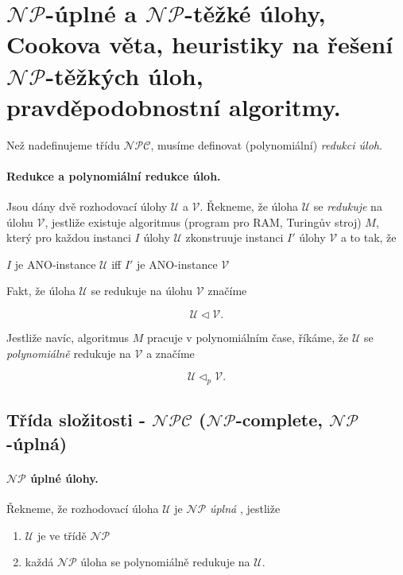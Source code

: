 \section[TAL - $\mathcal{NP}$ (complete, hard), Cookova věta, ..]{$\mathcal{NP}$-úplné a $\mathcal{NP}$-těžké úlohy, Cookova věta, heuristiky na řešení $\mathcal{NP}$-těžkých úloh, pravděpodobnostní algoritmy.}

Než nadefinujeme třídu $\mathcal{NPC}$, musíme definovat (polynomiální) \textit{redukci úloh}.

\paragraph{Redukce a polynomiální redukce úloh.} Jsou dány dvě rozhodovací úlohy $\mathcal{U}$ a $\mathcal{V}$. Řekneme, že úloha $\mathcal{U}$ se \textit{redukuje} na úlohu $\mathcal{V}$, jestliže existuje algoritmus (program pro RAM, Turingův stroj) $M$, který pro každou instanci $I$ úlohy $\mathcal{U}$ zkonstruuje instanci $I'$ úlohy $\mathcal{V}$ a to tak, že

\begin{center}
    $I$ je ANO-instance $\mathcal{U}$ iff $I'$ je ANO-instance $\mathcal{V}$
\end{center}

\noindent Fakt, že úloha $\mathcal{U}$ se redukuje na úlohu $\mathcal{V}$ značíme

$$\mathcal{U} \lhd \mathcal{V}.$$

Jestliže navíc, algoritmus $M$ pracuje v polynomiálním čase, říkáme, že $\mathcal{U}$ se \textit{polynomiálně} redukuje na $\mathcal{V}$ a značíme

$$\mathcal{U} \lhd_p \mathcal{V}.$$

\subsection{Třída složitosti - $\mathcal{NPC}$ ($\mathcal{NP}$-complete, $\mathcal{NP}$-úplná)}
\label{heading:npc}

\paragraph{$\mathcal{NP}$ úplné úlohy.} Řekneme, že rozhodovací úloha $\mathcal{U}$ je $\mathcal{NP}$ \textit{úplná }, jestliže

\begin{enumerate}[itemsep=0pt]
    \item $\mathcal{U}$ je ve třídě $\mathcal{NP}$
    \item každá $\mathcal{NP}$ úloha se polynomiálně redukuje na $\mathcal{U}$.
\end{enumerate}

